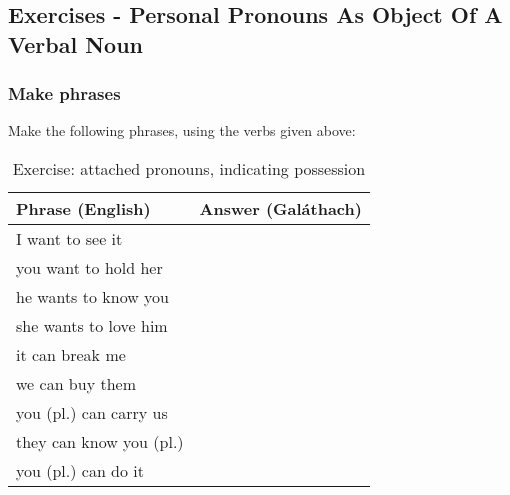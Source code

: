 \newpage
\subsection{Exercises - Personal Pronouns As Object Of A Verbal Noun}

\subsubsection{Make phrases}

Make the following phrases, using the verbs given above:
\begin{table}[H]
\centering
\begin{tabular}{|l|M{10.0cm}|}
  \toprule
  \textbf{Phrase (English)} & \textbf{Answer (Gal\'{a}thach)}\\
  \midrule
  I want to see it & \\
  \midrule
  you want to hold her & \\
  \midrule
  he wants to know you & \\
  \midrule
  she wants to love him & \\
  \midrule
  it can break me & \\
  \midrule
  we can buy them & \\
  \midrule
  you (pl.) can carry us & \\
  \midrule
  they can know you (pl.) & \\
  \midrule
  you (pl.) can do it & \\
  \bottomrule
\end{tabular}
\label{exercise_attached_pronouns_indicating_possession}
\caption{Exercise: attached pronouns, indicating possession}
\end{table}

\newpage

